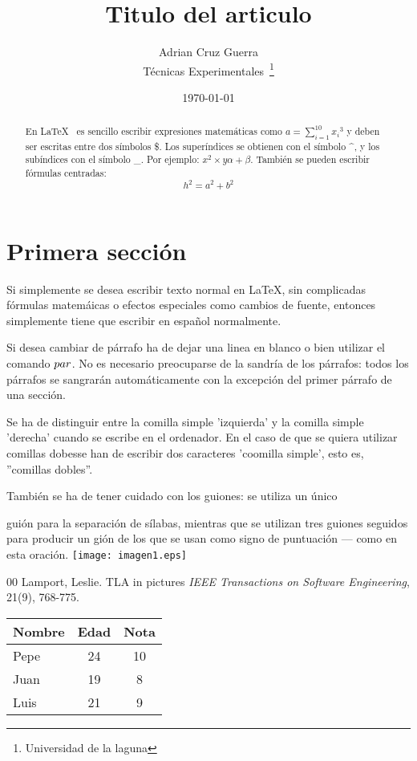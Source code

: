 \documentclass[a4paper, 12pt]{article}
\begin{document}
\title {Titulo del articulo}
\author {Adrian Cruz Guerra\\
	    Técnicas Experimentales~\footnote{Universidad de la laguna}
	    }
\date {\today}
\maketitle
\begin{abstract}

  En \LaTeX {}~\cite{Lam:86} es sencillo escribir expresiones 
  matemáticas como $a=\sum_{i=1}^{10} {x_i}^{3}$
  y deben ser escritas entre dos símbolos \$.
  Los superíndices se obtienen con el símbolo \^{}, y
  los subíndices con el símbolo \_.
  Por ejemplo: $x^2 \times y {\alpha + \beta}$.
  También se pueden escribir fórmulas centradas:
  \[h^2=a^2 + b^2\]
\end {abstract}

\section {Primera sección}
Si simplemente se desea escribir texto normal en LaTeX,
sin complicadas f\'ormulas matem\'aicas o efectos especiales
como cambios de fuente, entonces simplemente tiene que escribir
en espa\~nol normalmente. \par
Si desea cambiar de párrafo ha de dejar una linea en blanco o bien
utilizar el comando $\\par$.
No es necesario preocuparse de la sandría de los párrafos:
todos los párrafos se sangrarán automáticamente con la excepción
del primer párrafo de una sección.


Se ha de distinguir entre la comilla simple 'izquierda'
y la comilla simple 'derecha' cuando se escribe en el ordenador.
En el caso de que se quiera utilizar comillas dobesse han de escribir
dos caracteres 'coomilla simple', esto es, 
''comillas dobles''.


También se ha de tener cuidado con los guiones: se utiliza un único

guión para la separación de sílabas, mientras que se utilizan 
tres guiones seguidos para producir un gión de los que se usan
como signo de puntuación --- como en esta oración.
\texttt{[image: imagen1.eps]}
\begin {thebibliography}{00}
    Lamport, Leslie.
    TLA in pictures
    \emph {IEEE Transactions on Software Engineering},
    21(9), 768-775.
\end {thebibliography}
\bigskip
\begin {tabular} {|l|c|c|}
\hline
  Nombre & Edad & Nota \\ \hline
  Pepe   &   24 &   10 \\ \hline
  Juan   &   19 &    8 \\ \hline
  Luis   &   21 &    9 \\ \hline
\end {tabular}
\end{document}
